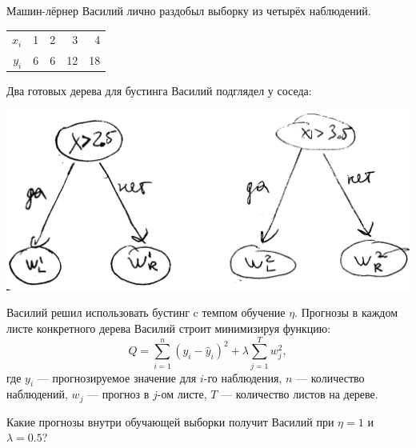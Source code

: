 \documentclass[11pt]{article}
\begin{document}
\begin{enumerate}
Машин-лёрнер Василий лично раздобыл выборку из четырёх наблюдений.


\begin{tabular}{rrrrr}
\toprule
$x_i$ & 1 & 2 & 3 & 4 \\
$y_i$ & 6 & 6 & 12 & 18 \\
\bottomrule
\end{tabular}

Два готовых дерева для бустинга Василий подглядел у соседа:

\begin{minipage}{0.4\textwidth}
\begin{center}
\includegraphics[scale=0.1]{images/two_trees.png}
%
\end{center}
\end{minipage}

Василий решил использовать бустинг c темпом обучение $\eta$. Прогнозы в каждом листе конкретного дерева Василий строит минимизируя функцию:
\[
	Q = \sum_{i=1}^n (y_i - \hat y_i)^2 + \lambda \sum_{j=1}^T w_j^2,
\]
где $y_i$ — прогнозируемое значение для $i$-го наблюдения, $n$ — количество наблюдений, $w_j$ — прогноз в $j$-ом листе, $T$ — количество листов на дереве.


Какие прогнозы внутри обучающей выборки получит Василий при $\eta=1$ и $\lambda=0.5$?


\end{enumerate}
\end{document}

